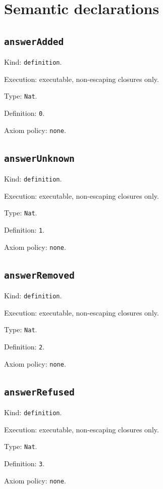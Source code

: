 \documentclass[11pt]{article}
\begin{document}
\section*{Semantic declarations}
\subsection*{\texttt{answerAdded}}
\noindent Kind: \texttt{definition}.\par
\noindent Execution: executable, non-escaping closures only.\par
\noindent Type: \texttt{Nat}.\par
\noindent Definition: \texttt{0}.\par
\noindent Axiom policy: \texttt{none}.\par
\subsection*{\texttt{answerUnknown}}
\noindent Kind: \texttt{definition}.\par
\noindent Execution: executable, non-escaping closures only.\par
\noindent Type: \texttt{Nat}.\par
\noindent Definition: \texttt{1}.\par
\noindent Axiom policy: \texttt{none}.\par
\subsection*{\texttt{answerRemoved}}
\noindent Kind: \texttt{definition}.\par
\noindent Execution: executable, non-escaping closures only.\par
\noindent Type: \texttt{Nat}.\par
\noindent Definition: \texttt{2}.\par
\noindent Axiom policy: \texttt{none}.\par
\subsection*{\texttt{answerRefused}}
\noindent Kind: \texttt{definition}.\par
\noindent Execution: executable, non-escaping closures only.\par
\noindent Type: \texttt{Nat}.\par
\noindent Definition: \texttt{3}.\par
\noindent Axiom policy: \texttt{none}.\par
\end{document}
